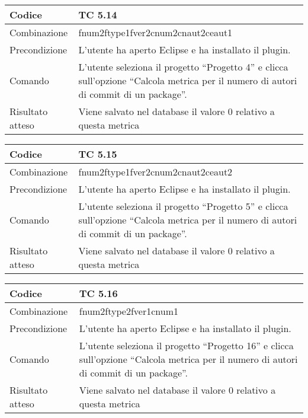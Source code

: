 \begin{table}[ht]
\begin{tabular}{|p{3cm}|p{9cm}|}
\hline
\cellcolor{lightgray}Codice				& TC 5.14								\\
\hline
\cellcolor{lightgray}Combinazione		& fnum2ftype1fver2cnum2cnaut2ceaut1								\\
\hline
\cellcolor{lightgray}Precondizione		& L'utente ha aperto Eclipse e ha installato il plugin.			\\
\hline
\cellcolor{lightgray}Comando			& L'utente seleziona il progetto ``Progetto 4''  e clicca sull'opzione ``Calcola metrica per il numero di autori di commit di un package''.	\\
\hline
\cellcolor{lightgray}Risultato atteso	& Viene salvato nel database il valore 0 relativo a questa metrica	\\
\hline
\end{tabular}
\end{table}

\begin{table}[ht]
\begin{tabular}{|p{3cm}|p{9cm}|}
\hline
\cellcolor{lightgray}Codice				& TC 5.15								\\
\hline
\cellcolor{lightgray}Combinazione		& fnum2ftype1fver2cnum2cnaut2ceaut2 									\\
\hline
\cellcolor{lightgray}Precondizione		& L'utente ha aperto Eclipse e ha installato il plugin.			\\
\hline
\cellcolor{lightgray}Comando			& L'utente seleziona il progetto ``Progetto 5''  e clicca sull'opzione ``Calcola metrica per il numero di autori di commit di un package''.	\\
\hline
\cellcolor{lightgray}Risultato atteso	& Viene salvato nel database il valore 0 relativo a questa metrica	\\
\hline
\end{tabular}
\end{table}



\begin{table}[ht]
\begin{tabular}{|p{3cm}|p{9cm}|}
\hline
\cellcolor{lightgray}Codice				& TC 5.16								\\
\hline
\cellcolor{lightgray}Combinazione		& fnum2ftype2fver1cnum1								\\
\hline
\cellcolor{lightgray}Precondizione		& L'utente ha aperto Eclipse e ha installato il plugin.				\\
\hline
\cellcolor{lightgray}Comando			& L'utente seleziona il progetto ``Progetto 16''  e clicca sull'opzione ``Calcola metrica per il numero di autori di commit di un package''.	\\
\hline
\cellcolor{lightgray}Risultato atteso	& Viene salvato nel database il valore 0 relativo a questa metrica	\\
\hline
\end{tabular}
\end{table}



